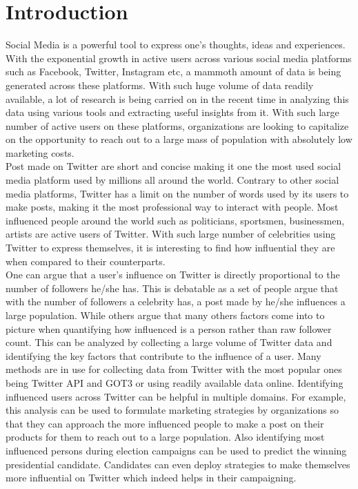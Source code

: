 \documentclass[sigconf]{acmart}
\begin{document}
\section{Introduction}
Social Media is a powerful tool to express one's thoughts, ideas and experiences. With the exponential growth in active users across various social media platforms such as Facebook, Twitter, Instagram etc, a mammoth amount of data is being generated across these platforms. With such huge volume of data readily available, a lot of research is being carried on in the recent time in analyzing this data using various tools and extracting useful insights from it. With such large number of active users on these platforms, organizations are looking to capitalize on the opportunity to reach out to a large mass of population with absolutely low marketing costs.\\
Post made on Twitter are short and concise making it one the most used social media platform used by millions all around the world. Contrary to other social media platforms, Twitter has a limit on the number of words used by its users to make posts, making it the most professional way to interact with people. Most influenced people around the world such as politicians, sportsmen, businessmen, artists are active users of Twitter. With such large number of celebrities using Twitter to express themselves, it is interesting to find how influential they are when compared to their counterparts.\\
One can argue that a user's influence on Twitter is directly proportional to the number of followers he/she has. This is debatable as a set of people argue that with the number of followers a celebrity has, a post made by he/she influences a large population. While others argue that many others factors come into to picture when quantifying how influenced is a person rather than raw follower count. This can be analyzed by collecting a large volume of Twitter data and identifying the key factors that contribute to the influence of a user. Many methods are in use for collecting data from Twitter with the most popular ones being Twitter API and GOT3 or using readily available data online. Identifying influenced users across Twitter can be helpful in multiple domains. For example, this analysis can be used to formulate marketing strategies by organizations so that they can approach the more influenced people to make a post on their products for them to reach out to a large population. Also identifying most influenced persons during election campaigns can be used to predict the winning presidential candidate. Candidates can even deploy strategies to make themselves more influential on Twitter which indeed helps in their campaigning.\\
\end{document}
